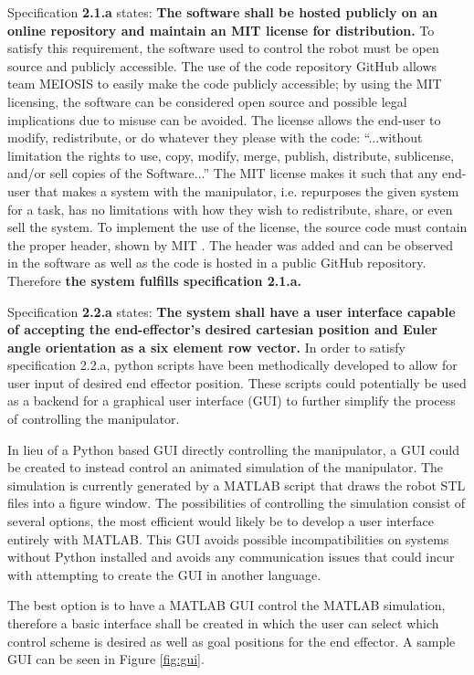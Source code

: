 Specification \textbf{2.1.a} states: \textbf{The software shall be hosted publicly on an online repository and maintain an MIT license for distribution.} To satisfy this requirement, the software used to control the robot must be open source and publicly accessible. The use of the code repository GitHub allows team MEIOSIS to easily make the code publicly accessible; by using the MIT licensing, the software can be considered open source and possible legal implications due to misuse can be avoided. The license allows the end-user to modify, redistribute, or do whatever they please with the code: “...without limitation the rights to use, copy, modify, merge, publish, distribute, sublicense, and/or sell copies of the Software...”\cite{mit} The MIT license makes it such that any end-user that makes a system with the manipulator, i.e. repurposes the given system for a task, has no limitations with how they wish to redistribute, share, or even sell the system. To implement the use of the license, the source code must contain the proper header, shown by MIT \cite{mit}. The header was added and can be observed in the software as well as the code is hosted in a public GitHub repository. Therefore \textbf{the system fulfills specification 2.1.a.}


Specification \textbf{2.2.a} states: \textbf{The system shall have a user interface capable of accepting the end-effector’s desired cartesian position and Euler angle orientation as a six element row vector.} In order to satisfy specification 2.2.a, python scripts have been methodically developed to allow for user input of desired end effector position. These scripts could potentially be used as a backend for a graphical user interface (GUI) to further simplify the process of controlling the manipulator.

In lieu of a Python based GUI directly controlling the manipulator, a GUI could be created to instead control an animated simulation of the manipulator. The simulation is currently generated by a MATLAB script that draws the robot STL files into a figure window. The possibilities of controlling the simulation consist of several options, the most efficient would likely be to develop a user interface entirely with MATLAB. This GUI avoids possible incompatibilities on systems without Python installed and avoids any communication issues that could incur with attempting to create the GUI in another language.

\newpage
The best option is to have a MATLAB GUI control the MATLAB simulation, therefore a basic interface shall be created in which the user can select which control scheme is desired as well as goal positions for the end effector. A sample GUI can be seen in Figure \ref{fig:gui}.

